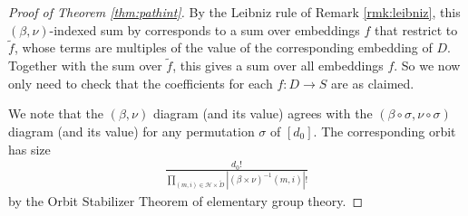 \documentclass[openany, notitlepage, justified]{tufte-book}
\theoremstyle{plain}
\theoremstyle{definition}
\newcommand{\wabs}[1]{\left|#1\right|}
\newcommand{\Hh}{\mathcal{H}}
\begin{document}
\begin{proof}[Proof of Theorem \ref{thm:pathint}]
            By the Leibniz rule of Remark \ref{rmk:leibniz}, this $(\beta,
            \nu)$-indexed sum by corresponds to a sum over embeddings $f$ that
            restrict to $\tilde f$, whose terms are multiples of the value of
            the corresponding embedding of $D$.  Together with the sum over
            $\tilde f$, this gives a sum over all embeddings $f$.  So we now
            only need to check that the coefficients for each $f:D\to S$ are as
            claimed.

            We note that the $(\beta, \nu)$ diagram (and its value) agrees with
            the $(\beta \circ \sigma, \nu \circ \sigma)$ diagram (and its
            value) for any permutation $\sigma$ of $[d_0]$.  The corresponding
            orbit has size
            \begin{align*}
                \frac{d_0!}{
                    \prod_{(m, i) \in \Hh \times \tilde D}
                        \wabs{(\beta \times \nu)^{-1}(m, i)}!
                }
            \end{align*}
            by the Orbit Stabilizer Theorem of elementary group theory.   


\end{proof}
\end{document}
